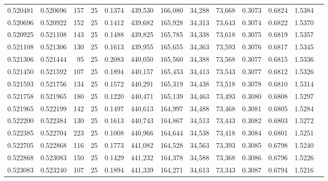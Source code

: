 \begin{tabular}{rrrrrrrrrrrrr}
0.520481 & 0.520696 &   157 &  25 &                                     0.1374 & 439,530 & 166,080 &  34,288 &  73,668 & 0.3073 & 0.6824 & 1.5384 \\
0.520696 & 0.520922 &   152 &  25 &                                     0.1412 & 439,682 & 165,928 &  34,313 &  73,643 & 0.3074 & 0.6822 & 1.5370 \\
0.520925 & 0.521108 &   143 &  25 &                                     0.1488 & 439,825 & 165,785 &  34,338 &  73,618 & 0.3075 & 0.6819 & 1.5357 \\
0.521108 & 0.521306 &   130 &  25 &                                     0.1613 & 439,955 & 165,655 &  34,363 &  73,593 & 0.3076 & 0.6817 & 1.5345 \\
0.521306 & 0.521444 &    95 &  25 &                                     0.2083 & 440,050 & 165,560 &  34,388 &  73,568 & 0.3077 & 0.6815 & 1.5336 \\
0.521450 & 0.521592 &   107 &  25 &                                     0.1894 & 440,157 & 165,453 &  34,413 &  73,543 & 0.3077 & 0.6812 & 1.5326 \\
0.521593 & 0.521756 &   134 &  25 &                                     0.1572 & 440,291 & 165,319 &  34,438 &  73,518 & 0.3078 & 0.6810 & 1.5314 \\
0.521758 & 0.521965 &   180 &  25 &                                     0.1220 & 440,471 & 165,139 &  34,463 &  73,493 & 0.3080 & 0.6808 & 1.5297 \\
0.521965 & 0.522199 &   142 &  25 &                                     0.1497 & 440,613 & 164,997 &  34,488 &  73,468 & 0.3081 & 0.6805 & 1.5284 \\
0.522200 & 0.522384 &   130 &  25 &                                     0.1613 & 440,743 & 164,867 &  34,513 &  73,443 & 0.3082 & 0.6803 & 1.5272 \\
0.522385 & 0.522704 &   223 &  25 &                                     0.1008 & 440,966 & 164,644 &  34,538 &  73,418 & 0.3084 & 0.6801 & 1.5251 \\
0.522705 & 0.522868 &   116 &  25 &                                     0.1773 & 441,082 & 164,528 &  34,563 &  73,393 & 0.3085 & 0.6798 & 1.5240 \\
0.522868 & 0.523083 &   150 &  25 &                                     0.1429 & 441,232 & 164,378 &  34,588 &  73,368 & 0.3086 & 0.6796 & 1.5226 \\
0.523083 & 0.523240 &   107 &  25 &                                     0.1894 & 441,339 & 164,271 &  34,613 &  73,343 & 0.3087 & 0.6794 & 1.5216 \\

\end{tabular}
